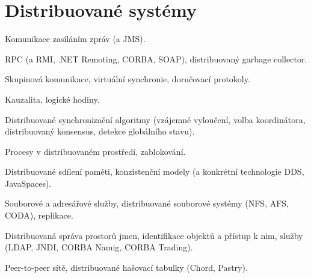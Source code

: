 \newpage
\section{Distribuované systémy}
\begin{pozadavky}
\begin{pitemize}
\item Komunikace zasíláním zpráv (a JMS).
\item RPC (a RMI, .NET Remoting, CORBA, SOAP), distribuovaný garbage collector.
\item Skupinová komunikace, virtuální synchronie, doručovací protokoly.
\item Kauzalita, logické hodiny.
\item Distribuované synchronizační algoritmy (vzájemné vyloučení, volba koordinátora, distribuovaný konsensus, detekce globálního stavu).
\item Procesy v distribuovaném prostředí, zablokování.
\item Distribuované sdílení paměti, konzistenční modely (a konkrétní technologie DDS, JavaSpaces).
\item Souborové a adresářové služby, distribuované souborové systémy (NFS, AFS, CODA), replikace.
\item Distribuovaná správa prostorů jmen, identifikace objektů a přístup k nim, služby (LDAP, JNDI, CORBA Namig, CORBA Trading).
\item Peer-to-peer sítě, distribuované hašovací tabulky (Chord, Pastry).
\end{pitemize}
\end{pozadavky}